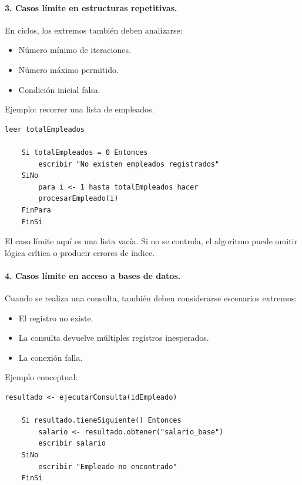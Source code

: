 \documentclass[12pt,twoside]{book}
\begin{document}
						\paragraph{3. Casos límite en estructuras repetitivas.} En ciclos, los extremos también deben analizarse:
						
						\begin{itemize}
							\item Número mínimo de iteraciones.
							\item Número máximo permitido.
							\item Condición inicial falsa.
						\end{itemize}
						
						Ejemplo: recorrer una lista de empleados.
						
						\begin{lstlisting}[style=upsamStyle, caption={Recorrido de lista considerando lista vacía.},
							label={lst:ListaVacia}, basicstyle=\small\ttfamily]
	leer totalEmpleados
	
	Si totalEmpleados = 0 Entonces
		escribir "No existen empleados registrados"
	SiNo
		para i <- 1 hasta totalEmpleados hacer
		procesarEmpleado(i)
	FinPara
	FinSi \end{lstlisting}
						
						El caso límite aquí es una lista vacía. Si no se controla, el algoritmo puede omitir lógica crítica o producir errores de índice.
						
						\paragraph{4. Casos límite en acceso a bases de datos.} Cuando se realiza una consulta, también deben considerarse escenarios extremos:
						
						\begin{itemize}
							\item El registro no existe.
							\item La consulta devuelve múltiples registros inesperados.
							\item La conexión falla.
						\end{itemize}
						
						Ejemplo conceptual:
						
						\begin{lstlisting}[style=upsamStyle, caption={Control de registro inexistente en consulta.},
							label={lst:RegistroInexistente}, basicstyle=\small\ttfamily]
	resultado <- ejecutarConsulta(idEmpleado)
	
	Si resultado.tieneSiguiente() Entonces
		salario <- resultado.obtener("salario_base")
		escribir salario
	SiNo
		escribir "Empleado no encontrado"
	FinSi \end{lstlisting}
						
\end{document}
